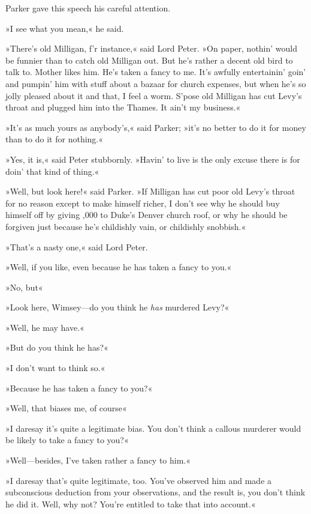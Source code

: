 Parker gave this speech his careful attention.

»I see what you mean,« he said.

»There's old Milligan, f'r instance,« said Lord Peter. »On paper, nothin' would be funnier than to catch old Milligan out. But he's rather a decent old bird to talk to. Mother likes him. He's taken a fancy to me. It's awfully entertainin' goin' and pumpin' him with stuff about a bazaar for church expenses, but when he's so jolly pleased about it and that, I feel a worm. S'pose old Milligan has cut Levy's throat and plugged him into the Thames. It ain't my business.«

»It's as much yours as anybody's,« said Parker; »it's no better to do it for money than to do it for nothing.«

»Yes, it is,« said Peter stubbornly. »Havin' to live is the only excuse there is for doin' that kind of thing.«

»Well, but look here!« said Parker. »If Milligan has cut poor old Levy's throat for no reason except to make himself richer, I don't see why he should buy himself off by giving ,000 to Duke's Denver church roof, or why he should be forgiven just because he's childishly vain, or childishly snobbish.«

»That's a nasty one,« said Lord Peter.

»Well, if you like, even because he has taken a fancy to you.«

»No, but\longdash«

»Look here, Wimsey\allowbreak---\allowbreak do you think he \textit{has} murdered Levy?«

»Well, he may have.«

»But do you think he has?«

»I don't want to think so.«

»Because he has taken a fancy to you?«

»Well, that biases me, of course\longdash«

»I daresay it's quite a legitimate bias. You don't think a callous murderer would be likely to take a fancy to you?«

»Well\allowbreak---\allowbreak besides, I've taken rather a fancy to him.«

»I daresay that's quite legitimate, too. You've observed him and made a subconscious deduction from your observations, and the result is, you don't think he did it. Well, why not? You're entitled to take that into account.«

